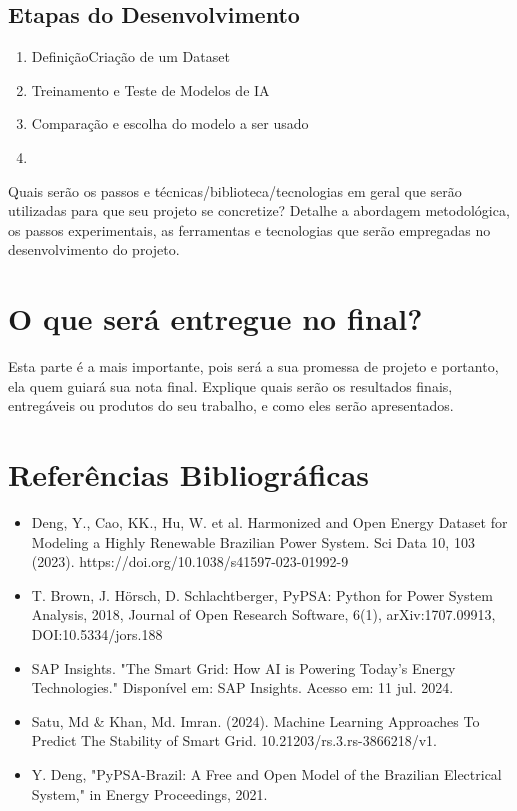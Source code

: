 \documentclass[a4paper,12pt]{article}
\begin{document}
\subsection{Etapas do Desenvolvimento}
\begin{enumerate}
    \item DefiniçãoCriação de um Dataset
    \item Treinamento e Teste de Modelos de IA
    \item Comparação e escolha do modelo a ser usado
    \item
\end{enumerate}
Quais serão os passos e técnicas/biblioteca/tecnologias em geral que serão utilizadas para que seu projeto se concretize?
Detalhe a abordagem metodológica, os passos experimentais, as ferramentas e tecnologias que serão empregadas no desenvolvimento do projeto.

\section{O que será entregue no final?}
Esta parte é a mais importante, pois será a sua promessa de projeto e portanto, ela quem guiará sua nota final.
Explique quais serão os resultados finais, entregáveis ou produtos do seu trabalho, e como eles serão apresentados.

\section{Referências Bibliográficas}
\begin{itemize}
    \item Deng, Y., Cao, KK., Hu, W. et al. Harmonized and Open Energy Dataset for Modeling a Highly Renewable Brazilian Power System. Sci Data 10, 103 (2023). https://doi.org/10.1038/s41597-023-01992-9
    \item T. Brown, J. Hörsch, D. Schlachtberger, PyPSA: Python for Power System Analysis, 2018, Journal of Open Research Software, 6(1), arXiv:1707.09913, DOI:10.5334/jors.188
    \item SAP Insights. "The Smart Grid: How AI is Powering Today’s Energy Technologies." Disponível em: SAP Insights. Acesso em: 11 jul. 2024.
    \item Satu, Md \& Khan, Md. Imran. (2024). Machine Learning Approaches To Predict The Stability of Smart Grid. 10.21203/rs.3.rs-3866218/v1.
    \item Y. Deng, "PyPSA-Brazil: A Free and Open Model of the Brazilian Electrical System," in Energy Proceedings, 2021.
\end{itemize}
\end{document}
